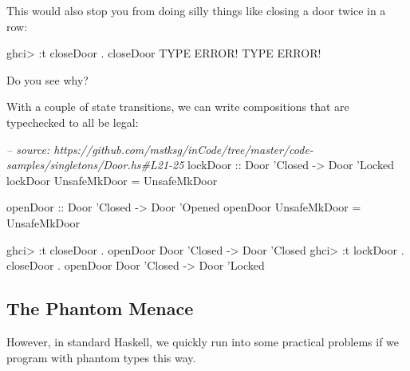\documentclass[]{article}
\newenvironment{Shaded}{}{}
\newcommand{\DataTypeTok}[1]{\textcolor[rgb]{0.56,0.13,0.00}{#1}}
\newcommand{\CharTok}[1]{\textcolor[rgb]{0.25,0.44,0.63}{#1}}
\newcommand{\CommentTok}[1]{\textcolor[rgb]{0.38,0.63,0.69}{\textit{#1}}}
\newcommand{\OtherTok}[1]{\textcolor[rgb]{0.00,0.44,0.13}{#1}}
\newcommand{\FunctionTok}[1]{\textcolor[rgb]{0.02,0.16,0.49}{#1}}
\newcommand{\NormalTok}[1]{#1}
\begin{document}
This would also stop you from doing silly things like closing a door twice in a
row:

\begin{Shaded}
\begin{Highlighting}[]
\NormalTok{ghci}\FunctionTok{>} \FunctionTok{:}\NormalTok{t closeDoor }\FunctionTok{.}\NormalTok{ closeDoor}
\DataTypeTok{TYPE} \DataTypeTok{ERROR}\FunctionTok{!}  \DataTypeTok{TYPE} \DataTypeTok{ERROR}\FunctionTok{!}
\end{Highlighting}
\end{Shaded}

Do you see why?

With a couple of state transitions, we can write compositions that are
typechecked to all be legal:

\begin{Shaded}
\begin{Highlighting}[]
\CommentTok{-- source: https://github.com/mstksg/inCode/tree/master/code-samples/singletons/Door.hs#L21-25}
\OtherTok{lockDoor ::} \DataTypeTok{Door} \CharTok{'Closed -> Door '}\DataTypeTok{Locked}
\NormalTok{lockDoor }\DataTypeTok{UnsafeMkDoor} \FunctionTok{=} \DataTypeTok{UnsafeMkDoor}

\OtherTok{openDoor ::} \DataTypeTok{Door} \CharTok{'Closed -> Door '}\DataTypeTok{Opened}
\NormalTok{openDoor }\DataTypeTok{UnsafeMkDoor} \FunctionTok{=} \DataTypeTok{UnsafeMkDoor}
\end{Highlighting}
\end{Shaded}

\begin{Shaded}
\begin{Highlighting}[]
\NormalTok{ghci}\FunctionTok{>} \FunctionTok{:}\NormalTok{t closeDoor }\FunctionTok{.}\NormalTok{ openDoor}
\DataTypeTok{Door} \CharTok{'Closed -> Door '}\DataTypeTok{Closed}
\NormalTok{ghci}\FunctionTok{>} \FunctionTok{:}\NormalTok{t lockDoor }\FunctionTok{.}\NormalTok{ closeDoor }\FunctionTok{.}\NormalTok{ openDoor}
\DataTypeTok{Door} \CharTok{'Closed -> Door '}\DataTypeTok{Locked}
\end{Highlighting}
\end{Shaded}

\subsection{The Phantom Menace}\label{the-phantom-menace}

However, in standard Haskell, we quickly run into some practical problems if we
program with phantom types this way.
\end{document}
